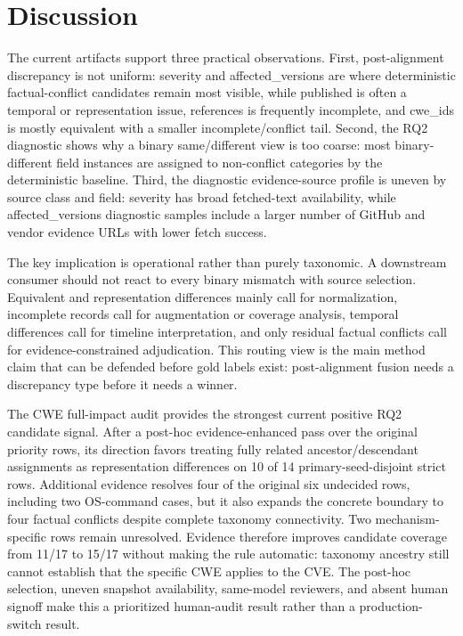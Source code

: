 \section{Discussion}

The current artifacts support three practical observations. First, post-alignment discrepancy is not uniform: severity and affected\_versions are where deterministic factual-conflict candidates remain most visible, while published is often a temporal or representation issue, references is frequently incomplete, and cwe\_ids is mostly equivalent with a smaller incomplete/conflict tail. Second, the RQ2 diagnostic shows why a binary same/different view is too coarse: most binary-different field instances are assigned to non-conflict categories by the deterministic baseline. Third, the diagnostic evidence-source profile is uneven by source class and field: severity has broad fetched-text availability, while affected\_versions diagnostic samples include a larger number of GitHub and vendor evidence URLs with lower fetch success.

The key implication is operational rather than purely taxonomic. A downstream consumer should not react to every binary mismatch with source selection. Equivalent and representation differences mainly call for normalization, incomplete records call for augmentation or coverage analysis, temporal differences call for timeline interpretation, and only residual factual conflicts call for evidence-constrained adjudication. This routing view is the main method claim that can be defended before gold labels exist: post-alignment fusion needs a discrepancy type before it needs a winner.

The CWE full-impact audit provides the strongest current positive RQ2 candidate signal. After a post-hoc evidence-enhanced pass over the original priority rows, its direction favors treating fully related ancestor/descendant assignments as representation differences on 10 of 14 primary-seed-disjoint strict rows. Additional evidence resolves four of the original six undecided rows, including two OS-command cases, but it also expands the concrete boundary to four factual conflicts despite complete taxonomy connectivity. Two mechanism-specific rows remain unresolved. Evidence therefore improves candidate coverage from 11/17 to 15/17 without making the rule automatic: taxonomy ancestry still cannot establish that the specific CWE applies to the CVE. The post-hoc selection, uneven snapshot availability, same-model reviewers, and absent human signoff make this a prioritized human-audit result rather than a production-switch result.

